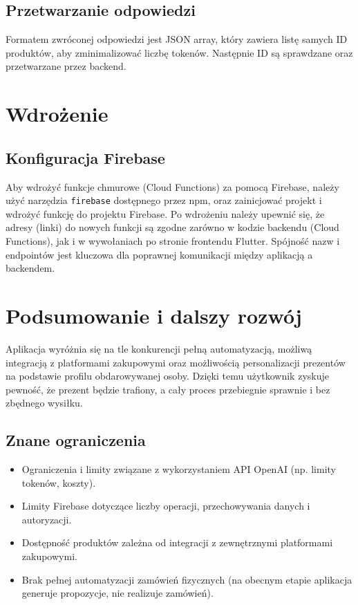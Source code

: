 \documentclass[a4paper, 12pt]{article}
\begin{document}
\subsection{Przetwarzanie odpowiedzi}
Formatem zwróconej odpowiedzi jest JSON array, który zawiera listę samych ID produktów,
aby zminimalizować liczbę tokenów. Następnie ID są sprawdzane oraz przetwarzane przez backend.

\section{Wdrożenie}
\subsection{Konfiguracja Firebase}
Aby wdrożyć funkcje chmurowe (Cloud Functions) za pomocą Firebase,
należy użyć narzędzia \texttt{firebase} dostępnego przez npm,
oraz zainicjować projekt i wdrożyć funkcję do projektu Firebase.
Po wdrożeniu należy upewnić się, że adresy (linki) do nowych funkcji są zgodne
zarówno w kodzie backendu (Cloud Functions), jak i w wywołaniach po stronie frontendu Flutter.
Spójność nazw i endpointów jest kluczowa dla poprawnej komunikacji między aplikacją a backendem.

\newpage
\section{Podsumowanie i dalszy rozwój}

Aplikacja wyróżnia się na tle konkurencji pełną automatyzacją,
możliwą integracją z platformami zakupowymi oraz możliwością personalizacji prezentów na podstawie
profilu obdarowywanej osoby. Dzięki temu użytkownik zyskuje pewność, że prezent będzie trafiony,
a cały proces przebiegnie sprawnie i bez zbędnego wysiłku.

\subsection{Znane ograniczenia}
\begin{itemize}
    \item Ograniczenia i limity związane z wykorzystaniem API OpenAI (np. limity tokenów, koszty).
    \item Limity Firebase dotyczące liczby operacji, przechowywania danych i autoryzacji.
    \item Dostępność produktów zależna od integracji z zewnętrznymi platformami zakupowymi.
    \item Brak pełnej automatyzacji zamówień fizycznych (na obecnym etapie aplikacja generuje propozycje, nie realizuje zamówień).
\end{itemize}
\end{document}
